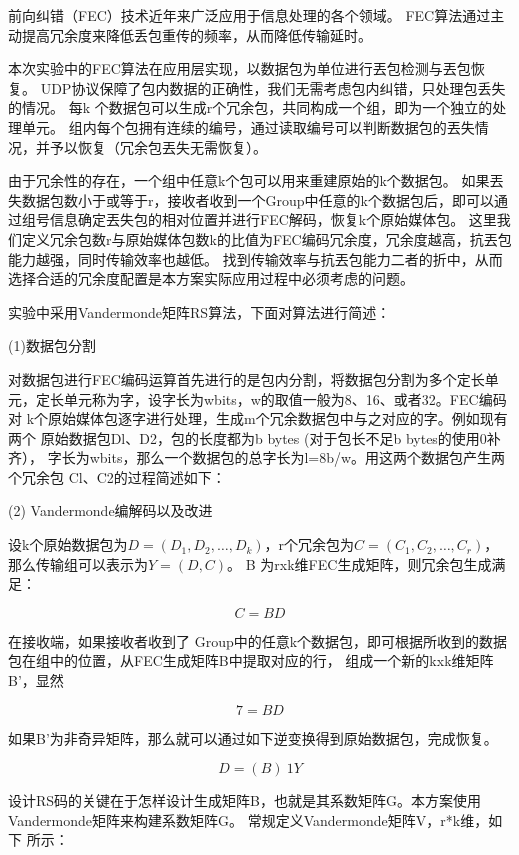 \documentclass[onecolumn]{article}
\begin{document}
\begin{CJK*}{UTF8}{gbsn}
前向纠错（FEC）技术近年来广泛应用于信息处理的各个领域。
FEC算法通过主动提高冗余度来降低丢包重传的频率，从而降低传输延时。

本次实验中的FEC算法在应用层实现，以数据包为单位进行丟包检测与丟包恢复。
UDP协议保障了包内数据的正确性，我们无需考虑包内纠错，只处理包丢失的情况。
每k 个数据包可以生成r个冗余包，共同构成一个组，即为一个独立的处理单元。
组内每个包拥有连续的编号，通过读取编号可以判断数据包的丟失情况，并予以恢复（冗余包丟失无需恢复）。 

由于冗余性的存在，一个组中任意k个包可以用来重建原始的k个数据包。
如果丟失数据包数小于或等于r，接收者收到一个Group中任意的k个数据包后，即可以通过组号信息确定丟失包的相对位置并进行FEC解码，恢复k个原始媒体包。
这里我们定义冗余包数r与原始媒体包数k的比值为FEC编码冗余度，冗余度越高，抗丟包能力越强，同时传输效率也越低。
找到传输效率与抗丟包能力二者的折中，从而 选择合适的冗余度配置是本方案实际应用过程中必须考虑的问题。

实验中采用Vandermonde矩阵RS算法，下面对算法进行简述：

 (1)数据包分割
 
对数据包进行FEC编码运算首先进行的是包内分割，将数据包分割为多个定长单元，定长单元称为字，设字长为wbits，w的取值一般为8、16、或者32。FEC编码对 k个原始媒体包逐字进行处理，生成m个冗余数据包中与之对应的字。例如现有两个 原始数据包Dl、D2，包的长度都为b bytes (对于包长不足b bytes的使用0补齐）， 字长为wbits，那么一个数据包的总字长为l=8b/w。用这两个数据包产生两个冗余包 Cl、C2的过程简述如下：

(2) Vandermonde编解码以及改进

设k个原始数据包为$D= (D_1,D_2,\dots,D_k)$，r个冗余包为$C=(C_1,C_2,\dots,C_r)$，那么传输组可以表示为$Y= (D,C)$。
B 为rxk维FEC生成矩阵，则冗余包生成满足：

$$C=BD$$

在接收端，如果接收者收到了 Group中的任意k个数据包，即可根据所收到的数据包在组中的位置，从FEC生成矩阵B中提取对应的行， 组成一个新的kxk维矩阵B’，显然

$$7 =BD$$

如果B’为非奇异矩阵，那么就可以通过如下逆变换得到原始数据包，完成恢复。

$$D = (B)~1Y$$

设计RS码的关键在于怎样设计生成矩阵B，也就是其系数矩阵G。本方案使用Vandermonde矩阵来构建系数矩阵G。
常规定义Vandermonde矩阵V，r*k维，如下 所示：



\end{CJK*}
\end{document}
